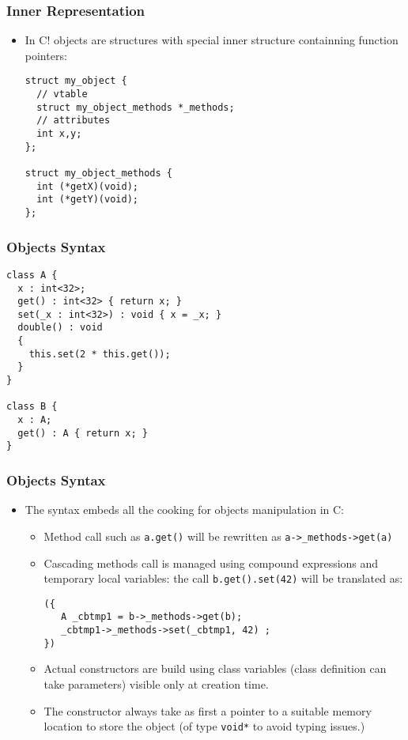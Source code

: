 \documentclass[pdftex]{beamer}
\begin{document}
\begin{frame}[fragile]
  \frametitle{Inner Representation}
  \begin{itemize}
  \item In C! objects are structures with special inner structure
    containning function pointers:
\begin{lstlisting}
struct my_object {
  // vtable
  struct my_object_methods *_methods;
  // attributes
  int x,y;
};

struct my_object_methods {
  int (*getX)(void);
  int (*getY)(void);
};
\end{lstlisting}

  \end{itemize}
\end{frame}

\begin{frame}
  \frametitle{Objects Syntax}
\begin{verbatim}
class A {
  x : int<32>;
  get() : int<32> { return x; }
  set(_x : int<32>) : void { x = _x; }
  double() : void
  {
    this.set(2 * this.get());
  }
}

class B {
  x : A;
  get() : A { return x; }
}
\end{verbatim}
\end{frame}

\begin{frame}[fragile]
  \frametitle{Objects Syntax}
  \begin{itemize}
  \item The syntax embeds all the cooking for objects manipulation in
    C:
    \begin{itemize}
    \item Method call such as \verb|a.get()| will be rewritten as
      \verb|a->_methods->get(a)|
    \item Cascading methods call is managed using compound expressions
      and temporary local variables: the call
      \verb|b.get().set(42)| will be translated as:
\begin{lstlisting}
({
   A _cbtmp1 = b->_methods->get(b);
   _cbtmp1->_methods->set(_cbtmp1, 42) ;
})
\end{lstlisting}
    \item Actual constructors are build using class variables (class
      definition can take parameters) visible only at creation time.
    \item The constructor always take as first a pointer to a suitable
      memory location to store the object (of type \verb|void*| to
      avoid typing issues.)
    \end{itemize}

  \end{itemize}
\end{frame}
\end{document}
